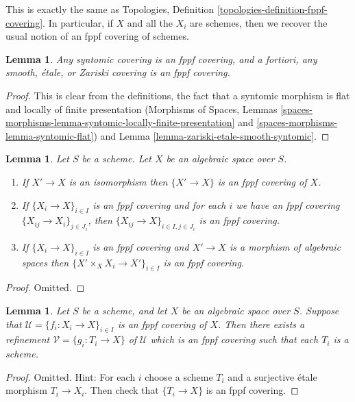 \documentclass{stacks-project}
\theoremstyle{plain}
\newtheorem{lemma}[subsection]{Lemma}
\theoremstyle{definition}
\theoremstyle{remark}
\numberwithin{equation}{subsection}
\begin{document}
\noindent
This is exactly the same as
Topologies, Definition \ref{topologies-definition-fppf-covering}.
In particular, if $X$ and all the $X_i$ are schemes, then we recover the usual
notion of an fppf covering of schemes.

\begin{lemma}
\label{lemma-zariski-etale-smooth-syntomic-fppf}
Any syntomic covering is an fppf covering, and a fortiori,
any smooth, \'etale, or Zariski covering is an fppf covering.
\end{lemma}

\begin{proof}
This is clear from the definitions, the fact that a syntomic morphism
is flat and locally of finite presentation
(Morphisms of Spaces, Lemmas
\ref{spaces-morphisms-lemma-syntomic-locally-finite-presentation} and
\ref{spaces-morphisms-lemma-syntomic-flat}) and
Lemma \ref{lemma-zariski-etale-smooth-syntomic}.
\end{proof}

\begin{lemma}
\label{lemma-fppf}
Let $S$ be a scheme.
Let $X$ be an algebraic space over $S$.
\begin{enumerate}
\item If $X' \to X$ is an isomorphism then $\{X' \to X\}$
is an fppf covering of $X$.
\item If $\{X_i \to X\}_{i\in I}$ is an fppf covering and for each
$i$ we have an fppf covering $\{X_{ij} \to X_i\}_{j\in J_i}$, then
$\{X_{ij} \to X\}_{i \in I, j\in J_i}$ is an fppf covering.
\item If $\{X_i \to X\}_{i\in I}$ is an fppf covering
and $X' \to X$ is a morphism of algebraic spaces then
$\{X' \times_X X_i \to X'\}_{i\in I}$ is an fppf covering.
\end{enumerate}
\end{lemma}

\begin{proof}
Omitted.
\end{proof}

\begin{lemma}
\label{lemma-refine-fppf-schemes}
Let $S$ be a scheme, and let $X$ be an algebraic space over $S$.
Suppose that $\mathcal{U} = \{f_i : X_i \to X\}_{i \in I}$ is an
fppf covering of $X$. Then there exists a refinement
$\mathcal{V} = \{g_i : T_i \to X\}$ of $\mathcal{U}$ which is an
fppf covering such that each $T_i$ is a scheme.
\end{lemma}

\begin{proof}
Omitted. Hint: For each $i$ choose a scheme $T_i$ and a surjective \'etale
morphism $T_i \to X_i$. Then check that $\{T_i \to X\}$ is an fppf covering.
\end{proof}
\end{document}
